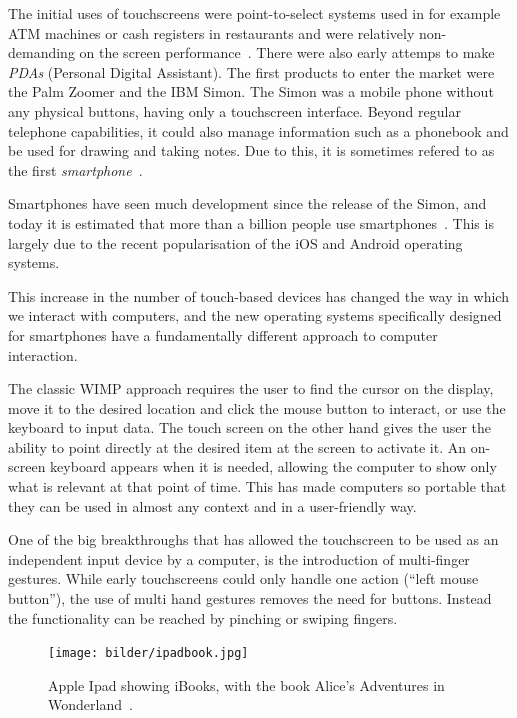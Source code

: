 The initial uses of touchscreens were point-to-select systems used in for example ATM machines or cash registers in restaurants and were relatively non-demanding on the screen performance~\cite{buxton}. There were also early attemps to make \emph{PDAs} (Personal Digital Assistant). The first products to enter the market were the Palm Zoomer and the IBM Simon. The Simon was a mobile phone without any physical buttons, having only a touchscreen interface. Beyond regular telephone capabilities, it could also manage information such as a phonebook and be used for drawing and taking notes. Due to this, it is sometimes refered to as the first \emph{smartphone}~\cite{buxton}.

Smartphones have seen much development since the release of the Simon, and today it is estimated that more than a billion people use smartphones~\cite{billion1, billion2}. This is largely due to the recent popularisation of the iOS and Android operating systems.

This increase in the number of touch-based devices has changed the way in which we interact with computers, and the new operating systems specifically designed for smartphones have a fundamentally different approach to computer interaction.

The classic WIMP approach requires the user to find the cursor on the display, move it to the desired location and click the mouse button to interact, or use the keyboard to input data. The touch screen on the other hand gives the user the ability to point directly at the desired item at the screen to activate it. An on-screen keyboard appears when it is needed, allowing the computer to show only what is relevant at that point of time. This has made computers so portable that they can be used in almost any context and in a user-friendly way.

One of the big breakthroughs that has allowed the touchscreen to be used as an independent input device by a computer, is the introduction of multi-finger gestures. While early touchscreens could only handle one action (``left mouse button''), the use of multi hand gestures removes the need for buttons. Instead the functionality can be reached by pinching or swiping fingers.

\begin{figure}[]
\center
\texttt{[image: bilder/ipadbook.jpg]}
\caption{Apple Ipad showing iBooks, with the book Alice's Adventures in Wonderland~\cite{ipadbook}.}
\label{ibooks}
\end{figure}

